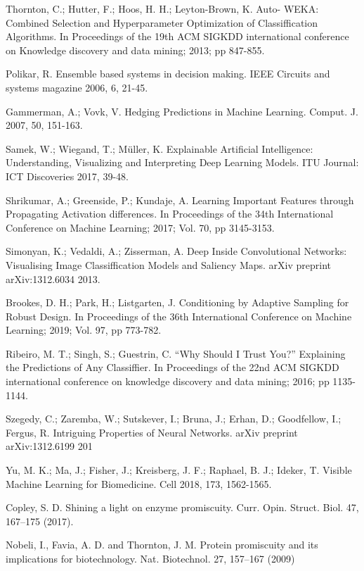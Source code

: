 \documentclass[12pt]{article}
\begin{document}
\begin{thebibliography}{99}
 Thornton, C.; Hutter, F.; Hoos, H. H.; Leyton-Brown, K. Auto- WEKA: Combined Selection and Hyperparameter Optimization of Classiffication Algorithms. In Proceedings of the 19th ACM SIGKDD international conference on Knowledge discovery and data mining; 2013; pp 847-855.

 Polikar, R. Ensemble based systems in decision making. IEEE Circuits and systems magazine 2006, 6, 21-45.

 Gammerman, A.; Vovk, V. Hedging Predictions in Machine Learning. Comput. J. 2007, 50, 151-163.

 Samek, W.; Wiegand, T.; Müller, K. Explainable Artificial Intelligence: Understanding, Visualizing and Interpreting Deep Learning Models. ITU Journal: ICT Discoveries 2017, 39-48. 

 Shrikumar, A.; Greenside, P.; Kundaje, A. Learning Important Features through Propagating Activation differences. In Proceedings of the 34th International Conference on Machine Learning; 2017; Vol. 70, pp 3145-3153.

 Simonyan, K.; Vedaldi, A.; Zisserman, A. Deep Inside Convolutional Networks: Visualising Image Classiffication Models and Saliency Maps. arXiv preprint arXiv:1312.6034 2013.

 Brookes, D. H.; Park, H.; Listgarten, J. Conditioning by Adaptive Sampling for Robust Design. In Proceedings of the 36th International Conference on Machine Learning; 2019; Vol. 97, pp 773-782.

 Ribeiro, M. T.; Singh, S.; Guestrin, C. “Why Should I Trust You?” Explaining the Predictions of Any Classiffier. In Proceedings of the 22nd ACM SIGKDD international conference on knowledge discovery and data mining; 2016; pp 1135-1144.

 Szegedy, C.; Zaremba, W.; Sutskever, I.; Bruna, J.; Erhan, D.; Goodfellow, I.; Fergus, R. Intriguing Properties of Neural Networks. arXiv preprint arXiv:1312.6199 201

 Yu, M. K.; Ma, J.; Fisher, J.; Kreisberg, J. F.; Raphael, B. J.; Ideker, T. Visible Machine Learning for Biomedicine. Cell 2018, 173, 1562-1565.


 Copley, S. D. Shining a light on enzyme promiscuity. Curr. Opin. Struct. Biol. 47, 167–175 (2017).

 Nobeli, I., Favia, A. D. and Thornton, J. M. Protein promiscuity and its implications for biotechnology. Nat. Biotechnol. 27, 157–167 (2009)


\end{thebibliography}
\end{document}
